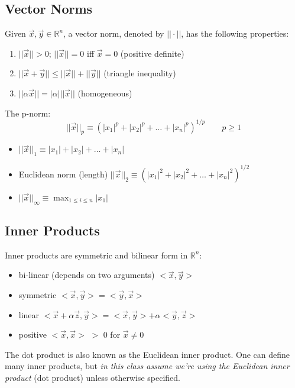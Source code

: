 \documentclass[12pt]{article}
\begin{document}
\subsection{Vector Norms}
Given $\vec{x}, \vec{y} \in \mathbb{R}^n$, a vector norm, denoted by $|| \cdot ||$, has the following properties:
%
\begin{enumerate}
\item $||\vec{x}|| > 0$; $||\vec{x}|| = 0$ iff $\vec{x} = 0$ (positive definite)
\item $||\vec{x} + \vec{y}|| \leq ||\vec{x}|| + ||\vec{y}||$ (triangle inequality)
\item $||\alpha \vec{x}|| = |\alpha| ||\vec{x}||$ (homogeneous)
\end{enumerate}

The p-norm:
%
\begin{equation}
||\vec{x}||_p \equiv (|x_1|^p + |x_2|^p + \dots + |x_n|^p)^{1/p} \qquad p \geq 1 \nonumber
\end{equation}
%
\begin{itemize}
\item $||\vec{x}||_1 \equiv |x_1| + |x_2| + \dots + |x_n|$
\item Euclidean norm (length) $||\vec{x}||_2 \equiv (|x_1|^2 + |x_2|^2 + \dots + |x_n|^2)^{1/2}$
\item $||\vec{x}||_{\infty} \equiv \displaystyle \max_{1 \leq i \leq n} |x_1|$
\end{itemize}

\subsection{Inner Products}
Inner products are symmetric and bilinear form in $\mathbb{R}^n$:
%
\begin{itemize}
\item bi-linear (depends on two arguments) $< \vec{x}, \vec{y} >$
\item symmetric $< \vec{x}, \vec{y} > = < \vec{y}, \vec{x} >$
\item linear $< \vec{x} + \alpha \vec{z}, \vec{y} > = < \vec{x}, \vec{y} > + \alpha < \vec{y}, \vec{z} >$
\item positive $< \vec{x}, \vec{x} >$ $>$ 0 for $\vec{x} \neq 0$
\end{itemize}

The dot product is also known as the Euclidean inner product. One can define many inner products, but \textit{in this class assume we're using the Euclidean inner product} (dot product) unless otherwise specified. 
\end{document}
